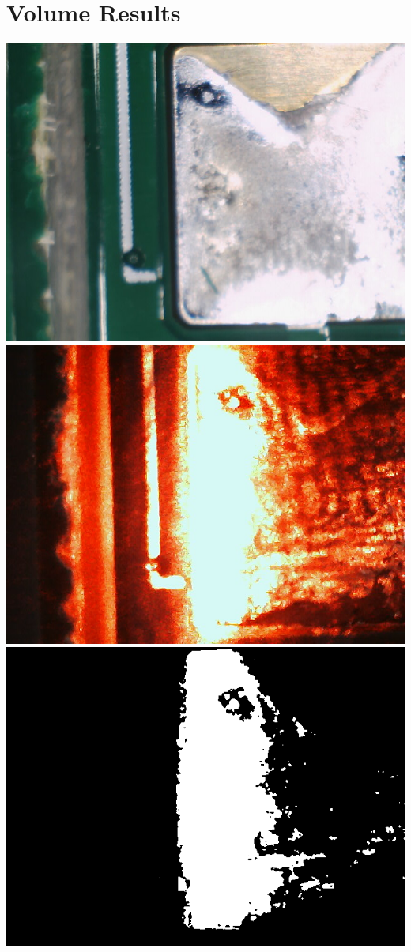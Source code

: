 \documentclass[12pt]{article}
\begin{document}
\section{Volume Results}
\includegraphics[scale=0.8]{images/volume_results/solder_led_hole.png}
\newpage
\includegraphics[scale=0.8]{images/volume_results/solder_laser_hole.png}
\newpage
\includegraphics[scale=0.8]{images/volume_results/binary_image_hole.png}
\end{document}
